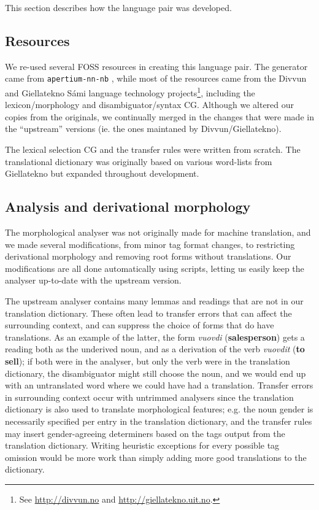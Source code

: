 \documentclass{book}
\begin{document}
This section describes how the language pair was developed.
\subsection{Resources}
We re-used several FOSS resources in creating this language pair. The
\nob{} generator came from {\tt apertium-nn-nb}
\citep{unhammer2009rfr}, while most of the \sme{} resources came from
the Divvun and Giellatekno S\'{a}mi language technology
projects\footnote{See \href{http://divvun.no}{http://divvun.no} and
  \href{http://giellatekno.uit.no}{http://giellatekno.uit.no}.},
including the lexicon/morphology and disambiguator/syntax CG. Although
we altered our copies from the originals, we continually merged in the
changes that were made in the ``upstream'' versions (ie. the ones
maintaned by Divvun/Giellatekno).

The lexical selection CG and the transfer rules were written from
scratch. The translational dictionary was originally based on various
word-lists from Giellatekno but expanded throughout development.

\subsection{Analysis and derivational morphology}
The morphological analyser was not originally made for machine
translation, and we made several modifications, from minor tag format
changes, to restricting derivational morphology and removing root
forms without translations. Our modifications are all done
automatically using scripts, letting us easily keep the analyser
up-to-date with the upstream version.

The upstream analyser contains many lemmas and readings that are not
in our translation dictionary. These often lead to transfer errors
that can affect the surrounding context, and can suppress the choice
of forms that do have translations. As an example of the latter, the
form \textit{vuovdi} (\textbf{salesperson}) gets a reading both as the
underived noun, and as a derivation of the verb \textit{vuovdit}
(\textbf{to sell}); if both were in the analyser, but only the verb
were in the translation dictionary, the disambiguator might still
choose the noun, and we would end up with an untranslated word where
we could have had a translation. Transfer errors in surrounding
context occur with untrimmed analysers since the translation
dictionary is also used to translate morphological features; e.g. the
\nob{} noun gender is necessarily specified per entry in the
translation dictionary, and the transfer rules may insert
gender-agreeing determiners based on the tags output from the
translation dictionary. Writing heuristic exceptions for every
possible tag omission would be more work than simply adding more good
translations to the dictionary.
\end{document}
